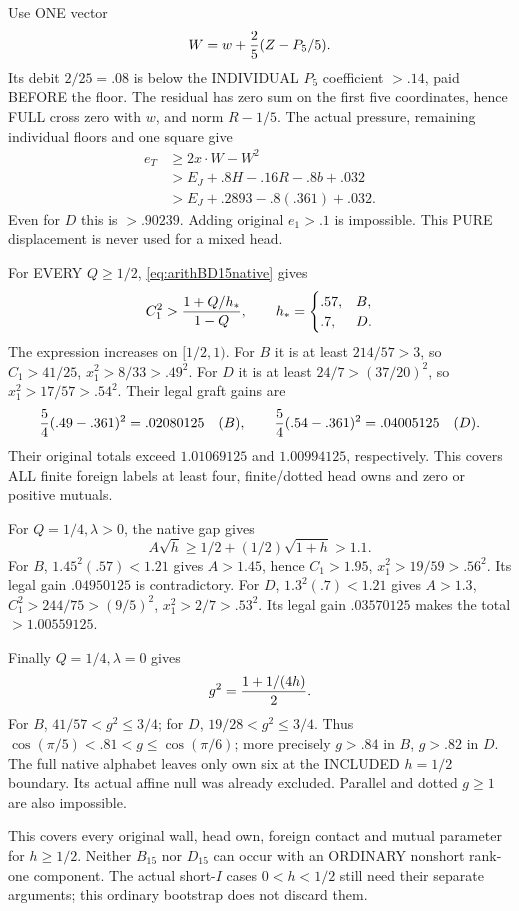 Use ONE vector
\[
                         W=w+{2\over5}(Z-P_5/5).
\]
Its debit \(2/25=.08\) is below the INDIVIDUAL
\(P_5\) coefficient \(>.14\), paid BEFORE the floor.
The residual has zero sum on the first five coordinates,
hence FULL cross zero with \(w\), and norm \(R-1/5\).
The actual pressure, remaining individual floors and
one square give
\[
 \begin{split}
 e_T&\ge2x\cdot W-W^2\\
    &>E_J+.8H-.16R-.8b+.032\\
    &>E_J+.2893-.8(.361)+.032 .
 \end{split}
\]
Even for \(D\) this is \(>.90239\).
Adding original \(e_1>.1\) is impossible.
This PURE displacement is never used for a mixed head.

For EVERY \(Q\ge1/2\),
\eqref{eq:arithBD15native} gives
\[
 C_1^2>{1+Q/h_*\over1-Q},\qquad
 h_*=\begin{cases}.57,&B,\\ .7,&D.\end{cases}
\]
The expression increases on \([1/2,1)\).
For \(B\) it is at least \(214/57>3\),
so \(C_1>41/25\), \(x_1^2>8/33>.49^2\).
For \(D\) it is at least \(24/7>(37/20)^2\),
so \(x_1^2>17/57>.54^2\).
Their legal graft gains are
\[
 {5\over4}(.49-.361)^2=.02080125\quad(B),\qquad
 {5\over4}(.54-.361)^2=.04005125\quad(D).
\]
Their original totals exceed \(1.01069125\)
and \(1.00994125\), respectively.
This covers ALL finite foreign labels at least four,
finite/dotted head owns and zero or positive mutuals.

For \(Q=1/4,\lambda>0\), the native gap gives
\[
                 A\sqrt h\ge1/2+(1/2)\sqrt{1+h}>1.1 .
\]
For \(B\), \(1.45^2(.57)<1.21\) gives \(A>1.45\),
hence \(C_1>1.95\), \(x_1^2>19/59>.56^2\).
Its legal gain \(.04950125\) is contradictory.
For \(D\), \(1.3^2(.7)<1.21\) gives \(A>1.3\),
\(C_1^2>244/75>(9/5)^2\), \(x_1^2>2/7>.53^2\).
Its legal gain \(.03570125\) makes the total
\(>1.00559125\).

Finally \(Q=1/4,\lambda=0\) gives
\[
                         g^2={1+1/(4h)\over2}.
\]
For \(B\), \(41/57<g^2\le3/4\);
for \(D\), \(19/28<g^2\le3/4\).
Thus
\(\cos(\pi/5)<.81<g\le\cos(\pi/6)\);
more precisely \(g>.84\) in \(B\), \(g>.82\) in \(D\).
The full native alphabet leaves only own six at the
INCLUDED \(h=1/2\) boundary.
Its actual affine null was already excluded.
Parallel and dotted \(g\ge1\) are also impossible.

This covers every original wall, head own, foreign
contact and mutual parameter for \(h\ge1/2\).
Neither \(B_{15}\) nor \(D_{15}\) can occur with an
ORDINARY nonshort rank-one component.
The actual short-\(I\) cases \(0<h<1/2\) still need
their separate arguments; this ordinary bootstrap
does not discard them.

